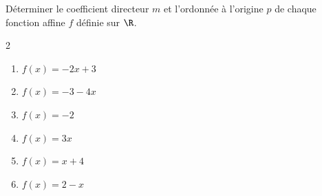 \begin{exo}{}
	Déterminer le coefficient directeur $m$ et l'ordonnée à l'origine $p$ de chaque fonction affine $f$ définie sur $\R$.
	\vspace*{-2mm}
	\begin{multicols}{2}
	\begin{enumerate}
		\item $f(x) = -2x + 3$
		\item $f(x) = -3 - 4x$
		\item $f(x) = -2$
		\item $f(x) = 3x$
		\item $f(x) = x + 4$
		\item $f(x) = 2 - x$
	\end{enumerate}
	\end{multicols}
\end{exo}
